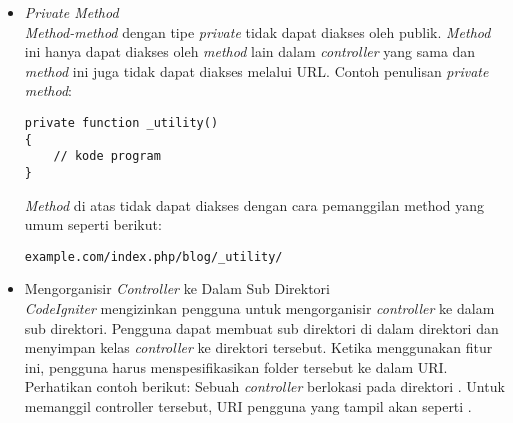\begin{itemize}
		\item \textit{Private Method}\\
		\textit{Method-method} dengan tipe \textit{private} tidak dapat diakses oleh publik. \textit{Method} ini hanya dapat diakses oleh \textit{method} lain dalam \textit{controller} yang sama dan \textit{method} ini juga tidak dapat diakses melalui URL. Contoh penulisan \textit{private method}:
		\begin{lstlisting}[basicstyle=\ttfamily, frame=single,
columns=fullflexible, keepspaces=true, breaklines=true]
private function _utility()
{
	// kode program
}
\end{lstlisting}
		
		\textit{Method} di atas tidak dapat diakses dengan cara pemanggilan method yang umum seperti berikut:
		\begin{lstlisting}[basicstyle=\ttfamily, frame=single,
columns=fullflexible, keepspaces=true, breaklines=true]
example.com/index.php/blog/_utility/
\end{lstlisting}
		
		\item Mengorganisir \textit{Controller} ke Dalam Sub Direktori \\
		\textit{CodeIgniter} mengizinkan pengguna untuk mengorganisir \textit{controller} ke dalam sub direktori. Pengguna dapat membuat sub direktori di dalam direktori  dan menyimpan kelas \textit{controller} ke direktori tersebut. Ketika menggunakan fitur ini, pengguna harus menspesifikasikan folder tersebut ke dalam URI. Perhatikan contoh berikut:
		Sebuah \textit{controller} berlokasi pada direktori . Untuk memanggil controller tersebut, URI pengguna yang tampil akan seperti .
	\end{itemize}


